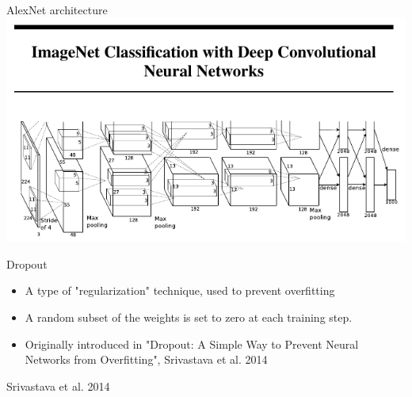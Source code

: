\documentclass[9pt, aspectratio=169]{beamer}
\begin{document}
\begin{frame}
    {AlexNet architecture}
    \centering
    \includegraphics[width=\textwidth]{AlexNet.png}
\end{frame}

\begin{frame}
    {Dropout}
    \begin{itemize}
        \item A type of "regularization" technique, used to prevent overfitting
        \item A random subset of the weights is set to zero at each training step.
        \item Originally introduced in "Dropout: A Simple Way to Prevent Neural Networks from Overfitting", Srivastava et al. 2014
    \end{itemize}

    \centering

    \footnotesize
    \raggedright
    Srivastava et al. 2014
\end{frame}
\end{document}
